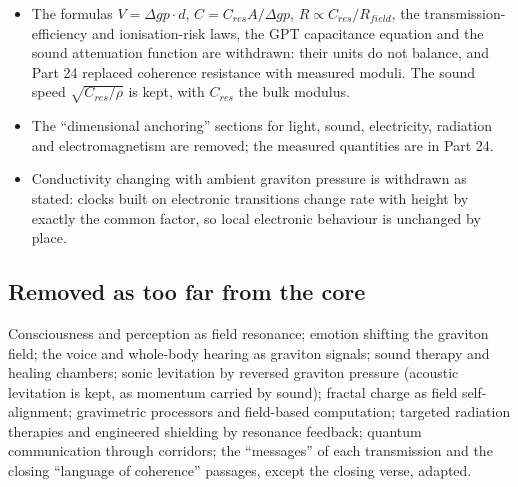 \begin{itemize}
\item The formulas $V = \Delta gp\cdot d$, $C = C_{res}A/\Delta gp$, $R \propto C_{res}/R_{field}$, the transmission-efficiency and ionisation-risk laws, the GPT capacitance equation and the sound attenuation function are withdrawn: their units do not balance, and Part 24 replaced coherence resistance with measured moduli. The sound speed $\sqrt{C_{res}/\rho}$ is kept, with $C_{res}$ the bulk modulus.
\item The ``dimensional anchoring'' sections for light, sound, electricity, radiation and electromagnetism are removed; the measured quantities are in Part 24.
\item Conductivity changing with ambient graviton pressure is withdrawn as stated: clocks built on electronic transitions change rate with height by exactly the common factor, so local electronic behaviour is unchanged by place.
\end{itemize}
\subsection*{Removed as too far from the core}
Consciousness and perception as field resonance; emotion shifting the graviton field; the voice and whole-body hearing as graviton signals; sound therapy and healing chambers; sonic levitation by reversed graviton pressure (acoustic levitation is kept, as momentum carried by sound); fractal charge as field self-alignment; gravimetric processors and field-based computation; targeted radiation therapies and engineered shielding by resonance feedback; quantum communication through corridors; the ``messages'' of each transmission and the closing ``language of coherence'' passages, except the closing verse, adapted.
